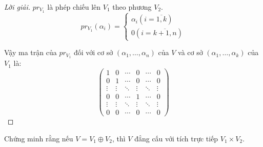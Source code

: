 \documentclass[class=nhvh-linear-algebra,crop=false]{standalone}
\begin{document}
\begin{proof}[Lời giải]
    $pr_{V_{1}}$ là phép chiếu lên $V_{1}$ theo phương $V_{2}$.
    \[
        pr_{V_{1}}(\alpha_{i}) =
        \begin{cases}
            \alpha_{i} (i = \overline{1, k}) \\
            0 (i = \overline{k+1,n})
        \end{cases}
    \]
    \par Vậy ma trận của $pr_{V_{1}}$ đối với cơ sở $(\alpha_{1}, \ldots, \alpha_{n})$ của $V$ và cơ sở $(\alpha_{1}, \ldots, \alpha_{k})$ của $V_{1}$ là:
    \[
        \begin{pmatrix}
            1      & 0      & \cdots & 0      & \cdots & 0      \\
            0      & 1      & \cdots & 0      & \cdots & 0      \\
            \vdots & \vdots & \ddots & \vdots & \ddots & \vdots \\
            0      & 0      & \cdots & 1      & \cdots & 0      \\
            \vdots & \vdots & \ddots & \vdots & \ddots & \vdots \\
            0      & 0      & \cdots & 0      & \cdots & 0
        \end{pmatrix}
    \]
\end{proof}

\begin{exercise}
    Chứng minh rằng nếu $V = V_{1}\oplus V_{2}$, thì $V$ đẳng cấu với tích trực tiếp $V_{1}\times V_{2}$.
\end{exercise}
\end{document}
